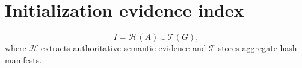 \documentclass{article}
\begin{document}
\section*{Initialization evidence index}
\label{dataset:init-evidence-index}
\[
I=\mathcal{H}(A)\cup\mathcal{T}(G),
\]
where \(\mathcal{H}\) extracts authoritative semantic evidence and \(\mathcal{T}\) stores aggregate hash manifests.
\end{document}
